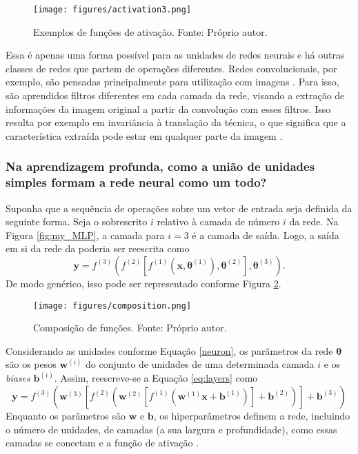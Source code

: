 \begin{figure}[H]
\begin{center}
\texttt{[image: figures/activation3.png]}
\caption[Exemplos de funções de ativação.]{Exemplos de funções de ativação. Fonte: Próprio autor.}
\label{fig:activation}
\end{center}
\end{figure}

Essa é apenas uma forma possível para as unidades de redes neurais e há outras classes de redes que partem de operações diferentes. Redes convolucionais, por exemplo, são pensadas principalmente para utilização com imagens \cite[Capítulo 9]{goodfellow2016deep}. Para isso, são aprendidos filtros diferentes em cada camada da rede, visando a extração de informações da imagem original a partir da convolução com esses filtros. Isso resulta por exemplo em invariância à translação da técnica, o que significa que a característica extraída pode estar em qualquer parte da imagem \cite[pág. 342]{goodfellow2016deep}.


\subsubsection{Na aprendizagem profunda, como a união de unidades simples formam a rede neural como um todo?}
Suponha que a sequência de operações sobre um vetor de entrada seja definida da seguinte forma. Seja o sobrescrito $i$ relativo à camada de número $i$ da rede. Na Figura \ref{fig:my_MLP}, a camada para $i=3$ é a camada de saída. Logo, a saída em si da rede da  poderia ser reescrita como
\begin{equation} 
\mathbf{y} = f^{(3)} \left( f^{(2)} [f^{(1)} (\mathbf{x}, \bm{\theta}^{(1)}), \bm{\theta}^{(2)}], \bm{\theta}^{(3)} \right).
\label{eq:layers}
\end{equation}
De modo genérico, isso pode ser representado conforme Figura \ref{fig:composition}. 
 \begin{figure}[H]
\begin{center}
\texttt{[image: figures/composition.png]}
\caption[Composição de funções.]{Composição de funções. Fonte: Próprio autor. }
\label{fig:composition}
\end{center}
\end{figure}

Considerando as unidades conforme Equação \eqref{neuron}, os parâmetros da rede $\bm{\theta}$ são os pesos $\mathbf{w}^{(i)}$ do conjunto de unidades de uma determinada camada $i$ e os \textit{biases} $\mathbf{b}^{(i)}$. Assim, reescreve-se a Equação \eqref{eq:layers} como 
\begin{equation}
\mathbf{y} = f^{(3)} \left( \mathbf{w}^{(3)} \left[ f^{(2)} (\mathbf{w}^{(2)}\left[ f^{(1)}(\mathbf{w}^{(1)}\mathbf{x} + \mathbf{b}^{(1)}) \right] + \mathbf{b}^{(2)})\right] + \mathbf{b}^{(3)} \right)
\label{eq:inf1}
\end{equation}
Enquanto os parâmetros são $\mathbf{w}$ e $\mathbf{b}$, os hiperparâmetros definem a rede, incluindo o número de unidades, de camadas (a sua largura e profundidade), como essas camadas se conectam e a função de ativação \cite[pág. 197]{goodfellow2016deep}. 

